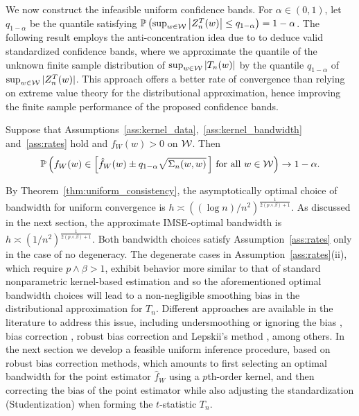 We now construct the infeasible uniform confidence bands.
For $\alpha \in (0,1)$, let $q_{1-\alpha}$ be the quantile satisfying
$ \mathbb{P}\left(\sup_{w \in \mathcal{W}}
  \left| Z_n^T(w) \right|
\leq q_{1-\alpha} \right)
= 1 - \alpha$.
The following result employs the anti-concentration idea due to
\citet{chernozhukov2014anti} to deduce valid standardized confidence bands,
where we approximate the quantile of the unknown finite sample distribution of
$\sup_{w\in\mathcal{W}} |T_n(w)|$ by the quantile $q_{1-\alpha}$ of
$\sup_{w\in\mathcal{W}}|Z_n^T(w)|$. This approach offers a better rate of
convergence than relying on extreme value theory
for the distributional approximation,
hence improving the finite sample performance of the proposed confidence bands.

\begin{theorem}
  \label{thm:infeasible_ucb}

  Suppose that Assumptions~\ref{ass:kernel_data},~\ref{ass:kernel_bandwidth}
  and~\ref{ass:rates} hold and
  $f_W(w) > 0$ on $\mathcal{W}$.
  Then
  \begin{align*}
    \mathbb{P}\left(
      f_W(w)
      \in
      \left[
        \hat f_W(w)
        \pm
        q_{1-\alpha}
        \sqrt{\Sigma_n(w,w)}
      \, \right]
      \, \textup{for all }
      w \in \mathcal{W}
    \right)
    \to 1 - \alpha.
  \end{align*}
\end{theorem}

By Theorem~\ref{thm:uniform_consistency},
the asymptotically optimal choice of bandwidth
for uniform convergence is
$h \asymp ((\log n)/n^2)^{\frac{1}{2(p \wedge \beta)+1}}$.
As discussed in the next section, the approximate
IMSE-optimal bandwidth is
$h \asymp (1/n^2)^{\frac{1}{2(p \wedge \beta)+1}}$.
Both bandwidth choices satisfy Assumption~\ref{ass:rates}
only in the case of no degeneracy.
The degenerate cases in Assumption~\ref{ass:rates}(ii),
which require $p \wedge \beta > 1$,
exhibit behavior more similar to that of standard
nonparametric kernel-based estimation
and so the aforementioned optimal bandwidth
choices will lead to a non-negligible smoothing bias in the distributional
approximation for $T_n$.
Different approaches are available in the literature to address this issue,
including undersmoothing or ignoring the bias \citep{hall2001bootstrapping},
bias correction \citep{hall1992effect}, robust bias correction
\citep{Calonico-Cattaneo-Farrell_2018_JASA,
Calonico-Cattaneo-Farrell_2022_Bernoulli}
and Lepskii's method \citep{lepskii1992asymptotically,birge2001alternative},
among others.
In the next section we develop a feasible uniform inference procedure,
based on robust bias correction methods,
which amounts to first selecting an optimal bandwidth for the point estimator
$\hat{f}_W$ using a $p$th-order kernel,
and then correcting the bias of the point estimator while also adjusting
the standardization (Studentization) when forming the $t$-statistic $T_n$.

